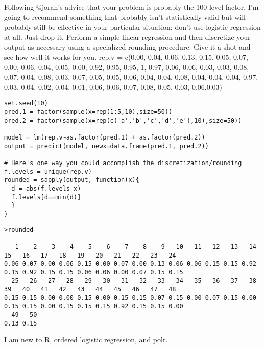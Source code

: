 Following @joran's advice that your problem is probably the 100-level factor, I'm going to recommend something that probably isn't statistically valid but will probably still be effective in your particular situation: don't use logistic regression at all. Just drop it. Perform a simple linear regression and then discretize your output as necessary using a specialized rounding procedure. Give it a shot and see how well it works for you.
rep.v = c(0.00, 0.04, 0.06, 0.13, 0.15, 0.05, 0.07, 0.00, 0.06, 0.04, 0.05, 0.00, 0.92, 0.95, 0.95, 1, 0.97, 0.06, 0.06, 0.03, 0.03, 0.08, 0.07, 0.04, 0.08, 0.03, 0.07, 0.05, 0.05, 0.06, 0.04, 0.04, 0.08, 0.04, 0.04, 0.04, 0.97, 0.03, 0.04, 0.02, 0.04, 0.01, 0.06, 0.06, 0.07, 0.08, 0.05, 0.03, 0.06,0.03)

\begin{framed}
\begin{verbatim}
set.seed(10)
pred.1 = factor(sample(x=rep(1:5,10),size=50))
pred.2 = factor(sample(x=rep(c('a','b','c','d','e'),10),size=50))

model = lm(rep.v~as.factor(pred.1) + as.factor(pred.2))
output = predict(model, newx=data.frame(pred.1, pred.2))

# Here's one way you could accomplish the discretization/rounding
f.levels = unique(rep.v)
rounded = sapply(output, function(x){ 
  d = abs(f.levels-x)
  f.levels[d==min(d)]
  }
)
\end{verbatim}
\end{framed}

\begin{verbatim}
>rounded

   1    2    3    4    5    6    7    8    9   10   11   12   13   14   15   16   17   18   19   20   21   22   23   24 
0.06 0.07 0.00 0.06 0.15 0.00 0.07 0.00 0.13 0.06 0.06 0.15 0.15 0.92 0.15 0.92 0.15 0.15 0.06 0.06 0.00 0.07 0.15 0.15 
  25   26   27   28   29   30   31   32   33   34   35   36   37   38   39   40   41   42   43   44   45   46   47   48 
0.15 0.15 0.00 0.00 0.15 0.00 0.15 0.15 0.07 0.15 0.00 0.07 0.15 0.00 0.15 0.15 0.00 0.15 0.15 0.15 0.92 0.15 0.15 0.00 
  49   50 
0.13 0.15 
\end{verbatim}
\newpage


I am new to R, ordered logistic regression, and polr.


